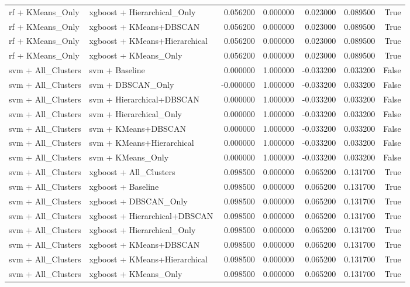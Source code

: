 \begin{tabular}{llrrrrr}
rf + KMeans_Only & xgboost + Hierarchical_Only & 0.056200 & 0.000000 & 0.023000 & 0.089500 & True \\
rf + KMeans_Only & xgboost + KMeans+DBSCAN & 0.056200 & 0.000000 & 0.023000 & 0.089500 & True \\
rf + KMeans_Only & xgboost + KMeans+Hierarchical & 0.056200 & 0.000000 & 0.023000 & 0.089500 & True \\
rf + KMeans_Only & xgboost + KMeans_Only & 0.056200 & 0.000000 & 0.023000 & 0.089500 & True \\
svm + All_Clusters & svm + Baseline & 0.000000 & 1.000000 & -0.033200 & 0.033200 & False \\
svm + All_Clusters & svm + DBSCAN_Only & -0.000000 & 1.000000 & -0.033200 & 0.033200 & False \\
svm + All_Clusters & svm + Hierarchical+DBSCAN & 0.000000 & 1.000000 & -0.033200 & 0.033200 & False \\
svm + All_Clusters & svm + Hierarchical_Only & 0.000000 & 1.000000 & -0.033200 & 0.033200 & False \\
svm + All_Clusters & svm + KMeans+DBSCAN & 0.000000 & 1.000000 & -0.033200 & 0.033200 & False \\
svm + All_Clusters & svm + KMeans+Hierarchical & 0.000000 & 1.000000 & -0.033200 & 0.033200 & False \\
svm + All_Clusters & svm + KMeans_Only & 0.000000 & 1.000000 & -0.033200 & 0.033200 & False \\
svm + All_Clusters & xgboost + All_Clusters & 0.098500 & 0.000000 & 0.065200 & 0.131700 & True \\
svm + All_Clusters & xgboost + Baseline & 0.098500 & 0.000000 & 0.065200 & 0.131700 & True \\
svm + All_Clusters & xgboost + DBSCAN_Only & 0.098500 & 0.000000 & 0.065200 & 0.131700 & True \\
svm + All_Clusters & xgboost + Hierarchical+DBSCAN & 0.098500 & 0.000000 & 0.065200 & 0.131700 & True \\
svm + All_Clusters & xgboost + Hierarchical_Only & 0.098500 & 0.000000 & 0.065200 & 0.131700 & True \\
svm + All_Clusters & xgboost + KMeans+DBSCAN & 0.098500 & 0.000000 & 0.065200 & 0.131700 & True \\
svm + All_Clusters & xgboost + KMeans+Hierarchical & 0.098500 & 0.000000 & 0.065200 & 0.131700 & True \\
svm + All_Clusters & xgboost + KMeans_Only & 0.098500 & 0.000000 & 0.065200 & 0.131700 & True \\

\end{tabular}

